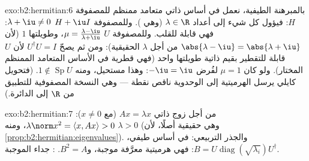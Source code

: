 \begin{solution}{exo:b2:hermitian:6}
بالمبرهنة الطيفية، نعمل في أساس ذاتي متعامد ممنظم للمصفوفة $H$:
فيؤول كل شيء إلى أعداد $\lambda \in \R$ (وهي ).
وللمصفوفة $H + \iu I$  $\lambda + \iu \neq 0$: فهي قابلة للقلب. وللمصفوفة $U$
 $\mu = \frac{\lambda - \iu}{\lambda + \iu}$، وطويلتها
$1$ (لأن $\abs{\lambda - \iu} = \abs{\lambda + \iu}$ من أجل $\lambda$ الحقيقية): ومن ثم يصحّ $U^\dagger U = I$ لأن $U$ قابلة للتقطير
 بقيم ذاتية طويلتها واحد (فهي قطرية في الأساس المتعامد
الممنظم المختار). ولو كان $\mu = 1$ لفُرض $-\iu = \iu$:
وهذا مستحيل، ومنه $1 \notin \operatorname{Sp} U$. (فتحويل كايلي
يرسل الهرميتية إلى الوحدوية ناقص نقطة --- وهي النسخة
المصفوفية للتطبيق من $\R$ إلى الدائرة.)
\end{solution}

\begin{solution}{exo:b2:hermitian:7}
من أجل زوج ذاتي $Ax = \lambda x$ (مع $x \neq 0$): $\lambda\norm x^2 =
\langle x, Ax\rangle > 0$، ومنه $\lambda > 0$ (وهي حقيقية أصلًا،
لأن \cref{prop:b2:hermitian:eigenvalues}). والجذر التربيعي: في أساس
طيفي، $B = U\operatorname{diag}(\sqrt{\lambda_i})U^\dagger$:
فهي هرميتية معرَّفة موجبة، و$B^2 = A$. : جداء
 الموجبة.
\end{solution}

